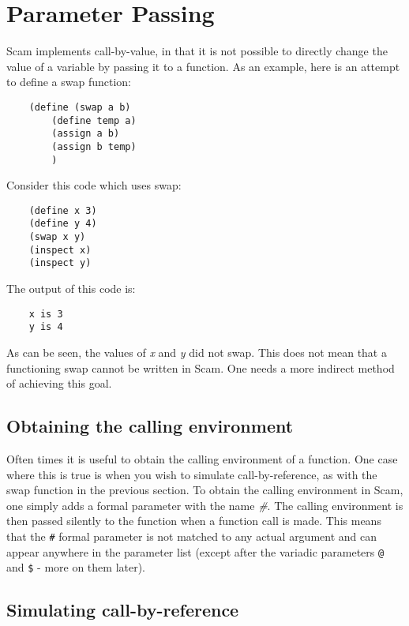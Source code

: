 \chapter{Parameter Passing}
\label{ParameterPassing}

Scam implements call-by-value, in that it is not possible
to directly change the value of a variable by passing it
to a function. As an example, here is an attempt to define
a swap function:

\begin{verbatim}
    (define (swap a b)
        (define temp a)
        (assign a b)
        (assign b temp)
        )
\end{verbatim}

Consider this code which uses swap:

\begin{verbatim}
    (define x 3)
    (define y 4)
    (swap x y)
    (inspect x)
    (inspect y)
\end{verbatim}

The output of this code is:

\begin{verbatim}
    x is 3
    y is 4
\end{verbatim}

As can be seen, the values of {\it x} and {\it y} did not swap.
This does not mean that a functioning swap cannot be written
in Scam. One needs a more indirect method of achieving this goal.

\section{Obtaining the calling environment}

Often times it is useful to obtain the calling environment
of a function. One case where this is true is when you
wish to simulate call-by-reference, as with the swap
function in the previous section. To obtain the
calling environment in Scam,
one simply adds a formal parameter with the name {\it #}.
The calling environment is then passed silently to the
function when a function call is made. This means that
the \verb!#! formal parameter is not matched to any actual argument
and can appear anywhere in the parameter list (except after
the variadic parameters \verb!@! and \verb!$! - more on them later).

\section{Simulating call-by-reference}

